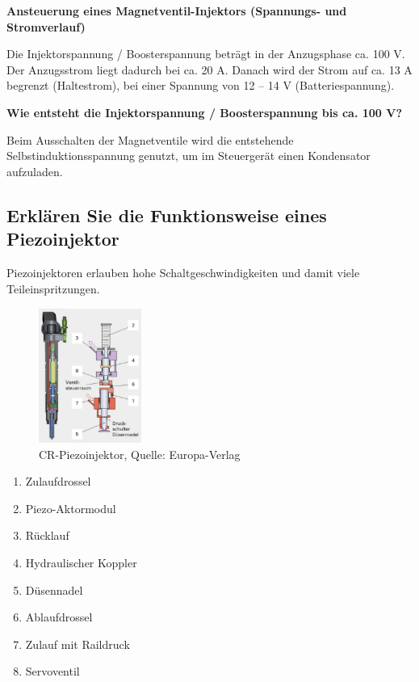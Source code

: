 \textbf{Ansteuerung eines Magnetventil-Injektors (Spannungs- und
Stromverlauf)}

Die Injektorspannung / Boosterspannung beträgt in der Anzugsphase ca.
100 V. Der Anzugsstrom liegt dadurch bei ca. 20 A. Danach wird der Strom
auf ca. 13 A begrenzt (Haltestrom), bei einer Spannung von 12 -- 14 V
(Batteriespannung).

\textbf{Wie entsteht die Injektorspannung / Boosterspannung bis ca. 100
V?}

Beim Ausschalten der Magnetventile wird die entstehende
Selbstinduktionsspannung genutzt, um im Steuergerät einen Kondensator
aufzuladen.

\newpage

\subsection{Erklären Sie die Funktionsweise eines
Piezoinjektor}\label{erklaeren-sie-die-funktionsweise-eines-piezoinjektor}

Piezoinjektoren erlauben hohe Schaltgeschwindigkeiten und damit viele
Teileinspritzungen.

\begin{figure}[!ht]%
\centering
\includegraphics[width=0.3\textwidth]{images/Diesel/Diesel-1.pdf}
\caption{CR-Piezoinjektor, Quelle: Europa-Verlag}
\end{figure}

\begin{enumerate}
\item
  Zulaufdrossel
\item
  Piezo-Aktormodul
\item
  Rücklauf
\item
  Hydraulischer Koppler
\item
  Düsennadel
\item
  Ablaufdrossel
\item
  Zulauf mit Raildruck
\item
  Servoventil
\end{enumerate}

